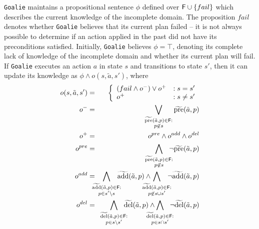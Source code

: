 \documentclass[letterpaper]{article}
\def\goalie{{\tt Goalie}}
\begin{document}
\goalie{} maintains a propositional sentence $\phi$ defined over ${\sf
F} \cup \{fail\}$ which describes the current knowledge of the
incomplete domain.  The proposition $fail$ denotes whether \goalie{} believes
that its current plan failed -- it is not always possible to determine if an
action applied in the past did not have its preconditions satisfied.  Initially,
\goalie{} believes $\phi = \top$, denoting its complete lack of knowledge of the
incomplete domain and whether its current plan will fail.    If \goalie{}
executes an action $a$ in state $s$ and transitions to state $s'$, then it can
update its knowledge as $\phi \wedge o(s, \tilde{a}, s')$, where
\noindent \begin{eqnarray}
o(s, \tilde{a}, s') &=& \left\{ \begin{array}{ll}
(fail \wedge o^-) \vee  o^+  &: s = s'\\
o^+  & : s \not= s'
\end{array}\right. \label{eqn:update}\\
o^- &=& \bigvee\limits_{\substack{\widetilde{\text{pre}}(\tilde{a},p) \in {\sf F}:\\ p \not\in s} } \widetilde{\text{pre}}(\tilde{a},p) \label{eqn:update1} \\
o^+ &=& o^{pre} \wedge o^{add} \wedge o^{del}\label{eqn:update2}\\
o^{pre} &=& \bigwedge\limits_{\substack{\widetilde{\text{pre}}(\tilde{a},p) \in
{\sf F}:\\ p \not\in s} }\hspace*{-0.25cm}\neg \widetilde{\text{pre}}(\tilde{a},p)\label{eqn:update3}  \\ o^{add} &=&  \hspace*{-.5cm}\bigwedge\limits_{\substack{\widetilde{\text{add}}(\tilde{a},p) \in {\sf F}:\\ p\in s'\backslash s} }\hspace*{-0.25cm}\widetilde{\text{add}}(\tilde{a},p)   \wedge  \hspace*{-0.5cm}\bigwedge\limits_{\substack{\widetilde{\text{add}}(\tilde{a},p) \in {\sf F}: \\ p \not\in  s\cup s'}} \hspace*{-0.25cm}\neg \widetilde{\text{add}}(\tilde{a},p)   \label{eqn:update4}\\
o^{del} &=& \hspace*{-.5cm} \bigwedge\limits_{\substack{\widetilde{\text{del}}(\tilde{a},p) \in {\sf F}: \\p \in s \backslash s'}} \hspace*{-0.25cm}\widetilde{\text{del}}(\tilde{a},p)  \wedge  \hspace*{-0.5cm}\bigwedge\limits_{\substack{\widetilde{\text{del}}(\tilde{a},p) \in {\sf F}:\\ p \in s\cap s'}} \hspace*{-0.25cm}\neg \widetilde{\text{del}}(\tilde{a},p)  \label{eqn:update5}
\end{eqnarray}
\end{document}

